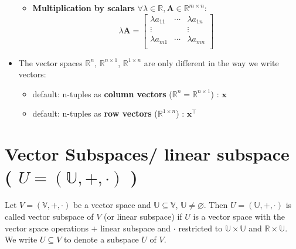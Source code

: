 \begin{itemize}
\begin{itemize}
        \item \textbf{Multiplication by scalars} $\forall \lambda\in\mathbb{R}, \mathbf{A}\in\mathbb{R}^{m\times n}$:
        \[
            \lambda\mathbf{A} = \begin{bmatrix}
                \lambda a_{11} & \cdots & \lambda a_{1n} \\
                \vdots & & \vdots \\
                \lambda a_{m1} & \cdots & \lambda a_{mn} \\
            \end{bmatrix}
        \]
    \end{itemize}

    \item The vector spaces $\mathbb{R}^n$, $\mathbb{R}^{n\times 1}$, $\mathbb{R}^{1\times n}$ are only different in the way we write vectors:
    \begin{itemize}
        \item default: n-tuples as \textbf{column vectors}\label{column vectors} ($\mathbb{R}^n = \mathbb{R}^{n \times 1}$) : $\mathbf{x}$

        \item default: n-tuples as \textbf{row vectors}\label{row vectors} ($\mathbb{R}^{1 \times n}$) : $\mathbf{x}^\top$
    \end{itemize}
\end{itemize}


\section{Vector Subspaces/ linear subspace ( $U = (\mathbb{U}, +, \cdot)$ ) \cite{mfml-1}}\label{Vector Subspaces/ linear subspace}
Let $V = (\mathbb{V}, +, \cdot)$ be a vector space and $\mathbb{U} \subseteq \mathbb{V}$, $\mathbb{U} \neq \varnothing$. Then $U = (\mathbb{U}, +, \cdot)$ is called vector subspace of $V$ (or linear subspace) if $U$ is a vector space with the vector space operations $+$ linear subspace and $\cdot$ restricted to $\mathbb{U} \times \mathbb{U}$ and $\mathbb{R} \times \mathbb{U}$. We write $U \subseteq V$ to denote a subspace $U$ of $V$.

